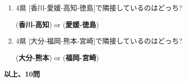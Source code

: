 \documentclass[11pt,a5paper]{ltjsarticle}
\begin{document}
\begin{enumerate}
 \item
      4県 [香川-愛媛-高知-徳島]で隣接しているのはどっち?
      \begin{center}
       (\textbf{香川-高知}) or (\textbf{愛媛-徳島})
      \end{center}

 \item
      4県 [大分-福岡-熊本-宮崎]で隣接しているのはどっち?
      \begin{center}
       (\textbf{大分-熊本}) or (\textbf{福岡-宮崎})
      \end{center}

\end{enumerate}

\hrulefill
\textbf{以上、10問}
\hrulefill
\end{document}
